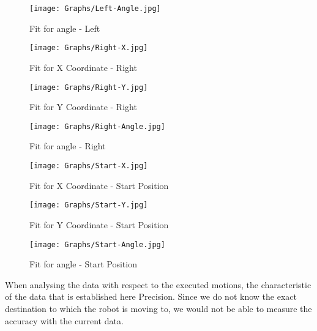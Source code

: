 \documentclass[10pt,a4paper]{article}
\begin{document}
\begin{figure}[H]
	\centering
	\texttt{[image: Graphs/Left-Angle.jpg]}
	\caption{Fit for angle - Left}
\end{figure}

\begin{figure}[H]
	\centering
	\texttt{[image: Graphs/Right-X.jpg]}
	\caption{Fit for X Coordinate - Right}
\end{figure}

\begin{figure}[H]
	\centering
	\texttt{[image: Graphs/Right-Y.jpg]}
	\caption{Fit for Y Coordinate - Right}
\end{figure}	

\begin{figure}[H]
	\centering
	\texttt{[image: Graphs/Right-Angle.jpg]}
	\caption{Fit for angle - Right}
\end{figure}

\begin{figure}[H]
	\centering
	\texttt{[image: Graphs/Start-X.jpg]}
	\caption{Fit for X Coordinate - Start Position}
\end{figure}

\begin{figure}[H]
	\centering
	\texttt{[image: Graphs/Start-Y.jpg]}
	\caption{Fit for Y Coordinate - Start Position}
\end{figure}	

\begin{figure}[H]
	\centering
	\texttt{[image: Graphs/Start-Angle.jpg]}
	\caption{Fit for angle - Start Position}
\end{figure}

When analysing the data with respect to the executed motions, the characteristic of the data that is established here Precision. Since we do not know the exact destination to which the robot is moving to, we would not be able to measure the accuracy with the current data.
\end{document}
